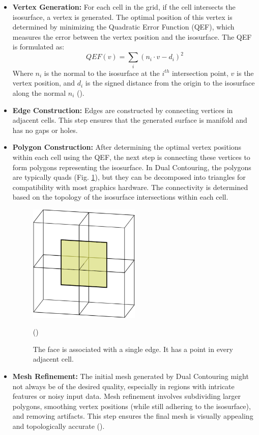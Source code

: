 \begin{itemize}
\item \textbf{Vertex Generation:} 
For each cell in the grid, if the cell intersects the isosurface, a vertex is generated. The optimal position of this vertex is determined by minimizing the Quadratic Error Function (QEF), which measures the error between the vertex position and the isosurface. The QEF is formulated as:
\begin{equation}
QEF(v) = \sum_{i} (n_i \cdot v - d_i)^2
\label{eq:qef}
\end{equation}
Where \( n_i \) is the normal to the isosurface at the \(i^{th}\) intersection point, \( v \) is the vertex position, and \( d_i \) is the signed distance from the origin to the isosurface along the normal \( n_i \) (\cite{Ju_2002}).

\item \textbf{Edge Construction:} Edges are constructed by connecting vertices in adjacent cells. This step ensures that the generated surface is manifold and has no gaps or holes.

\item \textbf{Polygon Construction:} After determining the optimal vertex positions within each cell using the QEF, the next step is connecting these vertices to form polygons representing the isosurface. In Dual Contouring, the polygons are typically quads (Fig. \ref{fig:DC-quad}), but they can be decomposed into triangles for compatibility with most graphics hardware. The connectivity is determined based on the topology of the isosurface intersections within each cell.

\begin{figure}[H]
\centering
\includegraphics[height=0.5\textwidth,width=0.5\textwidth]{Figures/dc_single_face.png}
\decoRule
\caption{The face is associated with a single edge. It has a point in every adjacent cell.} (\cite{Boristhebrave_2018})
\label{fig:DC-quad}
\end{figure}

\item \textbf{Mesh Refinement:} The initial mesh generated by Dual Contouring might not always be of the desired quality, especially in regions with intricate features or noisy input data. Mesh refinement involves subdividing larger polygons, smoothing vertex positions (while still adhering to the isosurface), and removing artifacts. This step ensures the final mesh is visually appealing and topologically accurate (\cite{Schaefer_2007}).
\end{itemize}


